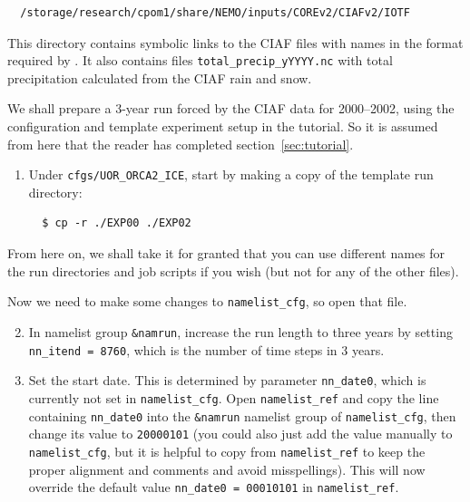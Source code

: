 \begin{verbatim}
  /storage/research/cpom1/share/NEMO/inputs/COREv2/CIAFv2/IOTF
\end{verbatim}

This directory contains symbolic links to the CIAF files with names in the format required by \NEMOSIcu{}.
It also contains files \verb|total_precip_yYYYY.nc| with total precipitation calculated from the CIAF rain and snow.

We shall prepare a 3-year run forced by the CIAF data for 2000--2002, using the configuration and template experiment setup in the tutorial.
So it is assumed from here that the reader has completed section~\ref{sec:tutorial}.

\begin{enumerate}

    \item Under \verb|cfgs/UOR_ORCA2_ICE|, start by making a copy of the template run directory:

\begin{verbatim}
  $ cp -r ./EXP00 ./EXP02
\end{verbatim}

\end{enumerate}

From here on, we shall take it for granted that you can use different names for the run directories and job scripts if you wish (but not for any of the other files).

Now we need to make some changes to \verb|namelist_cfg|, so open that file.

\begin{enumerate}\setcounter{enumi}{1}
    \item In namelist group \verb|&namrun|, increase the run length to three years by setting \verb|nn_itend = 8760|, which is the number of time steps in 3 years.
    
    \item Set the start date. This is determined by parameter \verb|nn_date0|, which is currently not set in \verb|namelist_cfg|.
    Open \verb|namelist_ref| and copy the line containing \verb|nn_date0| into the \verb|&namrun| namelist group of \verb|namelist_cfg|, then change its value to \verb|20000101| (you could also just add the value manually to \verb|namelist_cfg|, but it is helpful to copy from \verb|namelist_ref| to keep the proper alignment and comments and avoid misspellings).
    This will now override the default value \verb|nn_date0 = 00010101| in \verb|namelist_ref|.
\end{enumerate}


